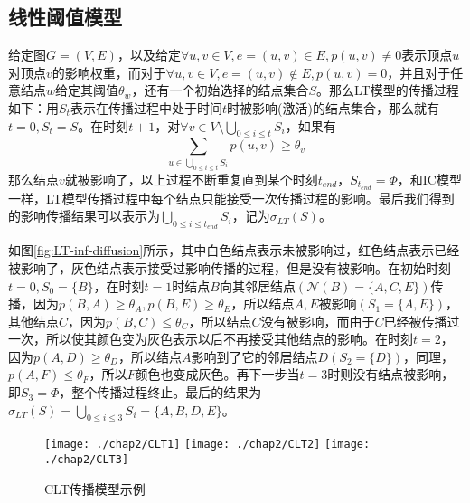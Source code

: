 \subsection{线性阈值模型}
\label{sec:LT-model-desc}
给定图$G=(V, E)$，以及给定$\forall u, v \in V, e=(u, v) \in E, p(u, v) \neq 0$表示顶点$u$对顶点$v$的影响权重，而对于$\forall u, v \in V, e=(u, v) \notin E, p(u, v)=0$，并且对于任意结点$w$给定其阈值$\theta_{w}$，还有一个初始选择的结点集合$S$。那么LT模型的传播过程如下：用$S_{t}$表示在传播过程中处于时间$t$时被影响(激活)的结点集合，那么就有$t=0, S_{t}=S$。在时刻$t+1$，对$\forall v \in V\setminus \bigcup_{0 \leq i \leq t}S_{i}$，如果有
\begin{displaymath} 
	{\sum_{u \in \bigcup_{0 \leq i \leq t}S_{i}}p(u,v) \geq \theta_{v}} 
\end{displaymath}
那么结点$v$就被影响了，以上过程不断重复直到某个时刻$t_{end}$，$S_{t_{end}}=\Phi$，和IC模型一样，LT模型传播过程中每个结点只能接受一次传播过程的影响。最后我们得到的影响传播结果可以表示为$\bigcup_{0 \leq i \leq t_{end}}S_{i}$，记为$\sigma_{LT}(S)$。


如图\ref{fig:LT-inf-diffusion}所示，其中白色结点表示未被影响过，红色结点表示已经被影响了，灰色结点表示接受过影响传播的过程，但是没有被影响。在初始时刻$t=0,S_{0}=\{B\}$，在时刻$t=1$时结点$B$向其邻居结点$(\mathcal{N}(B)=\{A, C, E\})$传播，因为$p(B,A) \geq \theta_{A}, p(B,E) \geq \theta_{E}$，所以结点$A, E$被影响$(S_{1}=\{A, E\})$，其他结点$C$，因为$p(B,C) \leq \theta_{C}$，所以结点$C$没有被影响，而由于$C$已经被传播过一次，所以使其颜色变为灰色表示以后不再接受其他结点的影响。在时刻$t=2$，因为$p(A,D) \geq \theta_{D}$，所以结点$A$影响到了它的邻居结点$D(S_{2}=\{D\})$，同理，$p(A, F) \leq \theta_{F}$，所以$F$颜色也变成灰色。再下一步当$t=3$时则没有结点被影响，即$S_{3}=\Phi$，整个传播过程终止。最后的结果为$\sigma_{LT}(S)=\bigcup_{0 \leq i \leq 3}S_{i}=\{A, B, D, E\}$。


\begin{figure}[H]
\centering%
	{\texttt{[image: ./chap2/CLT1]}}
	\hspace{1mm}%
	{\texttt{[image: ./chap2/CLT2]}}
	\hspace{1mm}%
	{\texttt{[image: ./chap2/CLT3]}}
	\caption{CLT传播模型示例}
	\label{fig:CLT-inf-diffusion}
\end{figure}


